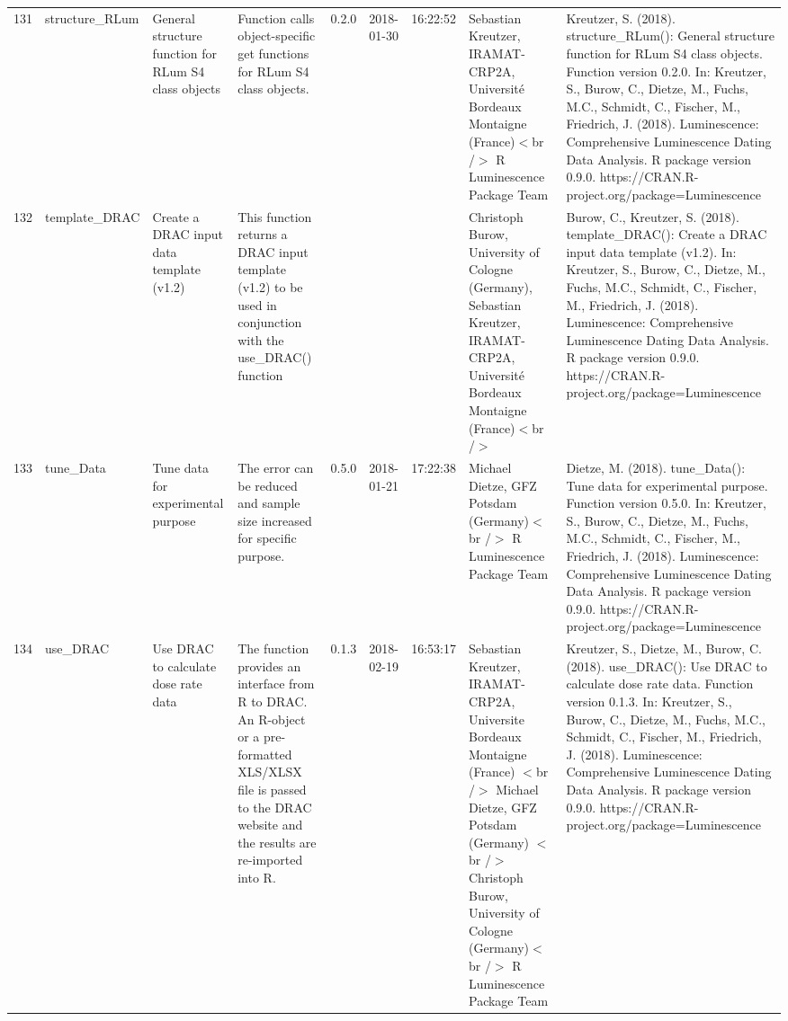 \begin{table}[ht]
\begin{tabular}{rllllllll}
 \\ 
  131 & structure\_RLum & General structure function for RLum S4 class objects & Function calls object-specific get functions for RLum S4 class objects. & 0.2.0 & 2018-01-30 & 16:22:52
 & Sebastian Kreutzer, IRAMAT-CRP2A, Université Bordeaux Montaigne (France)$<$br /$>$  R Luminescence Package Team & Kreutzer, S. (2018). structure\_RLum(): General structure function for RLum S4 class objects. Function version 0.2.0. In: Kreutzer, S., Burow, C., Dietze, M., Fuchs, M.C., Schmidt, C., Fischer, M., Friedrich, J. (2018). Luminescence: Comprehensive Luminescence Dating Data Analysis. R package version 0.9.0. https://CRAN.R-project.org/package=Luminescence
 \\ 
  132 & template\_DRAC & Create a DRAC input data template (v1.2) & This function returns a DRAC input template (v1.2) to be used in conjunction with the use\_DRAC() function &  &  &  & Christoph Burow, University of Cologne (Germany), Sebastian Kreutzer, IRAMAT-CRP2A, Université Bordeaux Montaigne (France)$<$br /$>$ & Burow, C., Kreutzer, S. (2018). template\_DRAC(): Create a DRAC input data template (v1.2). In: Kreutzer, S., Burow, C., Dietze, M., Fuchs, M.C., Schmidt, C., Fischer, M., Friedrich, J. (2018). Luminescence: Comprehensive Luminescence Dating Data Analysis. R package version 0.9.0. https://CRAN.R-project.org/package=Luminescence
 \\ 
  133 & tune\_Data & Tune data for experimental purpose & The error can be reduced and sample size increased for specific purpose. & 0.5.0 & 2018-01-21 & 17:22:38
 & Michael Dietze, GFZ Potsdam (Germany)$<$br /$>$  R Luminescence Package Team & Dietze, M. (2018). tune\_Data(): Tune data for experimental purpose. Function version 0.5.0. In: Kreutzer, S., Burow, C., Dietze, M., Fuchs, M.C., Schmidt, C., Fischer, M., Friedrich, J. (2018). Luminescence: Comprehensive Luminescence Dating Data Analysis. R package version 0.9.0. https://CRAN.R-project.org/package=Luminescence
 \\ 
  134 & use\_DRAC & Use DRAC to calculate dose rate data & The function provides an interface from R to DRAC. An R-object or a pre-formatted XLS/XLSX file is passed to the DRAC website and the results are re-imported into R. & 0.1.3 & 2018-02-19 & 16:53:17
 & Sebastian Kreutzer, IRAMAT-CRP2A, Universite Bordeaux Montaigne (France) $<$br /$>$ Michael Dietze, GFZ Potsdam (Germany) $<$br /$>$ Christoph Burow, University of Cologne (Germany)$<$br /$>$  R Luminescence Package Team & Kreutzer, S., Dietze, M., Burow, C. (2018). use\_DRAC(): Use DRAC to calculate dose rate data. Function version 0.1.3. In: Kreutzer, S., Burow, C., Dietze, M., Fuchs, M.C., Schmidt, C., Fischer, M., Friedrich, J. (2018). Luminescence: Comprehensive Luminescence Dating Data Analysis. R package version 0.9.0. https://CRAN.R-project.org/package=Luminescence

\end{tabular}
\end{table}
